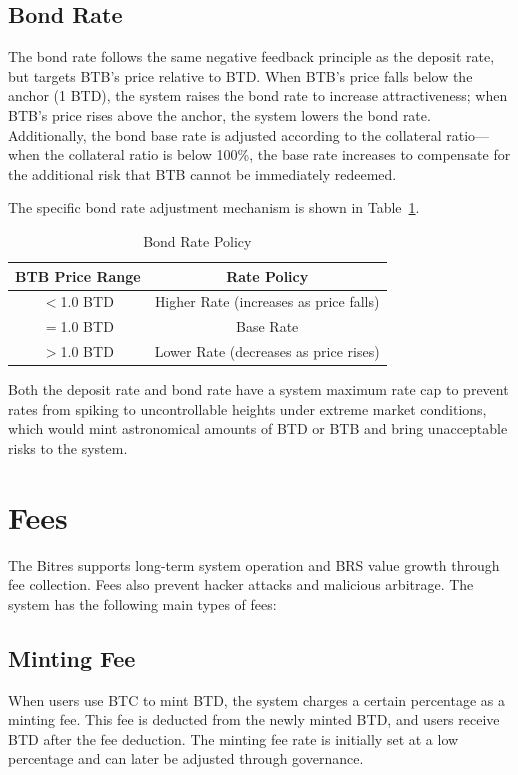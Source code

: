 \documentclass{article}
\begin{document}
\subsection{Bond Rate}

The bond rate follows the same negative feedback principle as the deposit rate, but targets BTB's price relative to BTD. When BTB's price falls below the anchor (1 BTD), the system raises the bond rate to increase attractiveness; when BTB's price rises above the anchor, the system lowers the bond rate. Additionally, the bond base rate is adjusted according to the collateral ratio---when the collateral ratio is below 100\%, the base rate increases to compensate for the additional risk that BTB cannot be immediately redeemed.

The specific bond rate adjustment mechanism is shown in Table~\ref{tab:bond-rate}.

\begin{table}[h]
\centering
\caption{Bond Rate Policy}
\label{tab:bond-rate}
\begin{tabular}{c|c}
\toprule
BTB Price Range & Rate Policy \\
\midrule
$<$1.0 BTD & Higher Rate (increases as price falls) \\
$=$1.0 BTD & Base Rate \\
$>$1.0 BTD & Lower Rate (decreases as price rises) \\
\bottomrule
\end{tabular}
\end{table}

Both the deposit rate and bond rate have a system maximum rate cap to prevent rates from spiking to uncontrollable heights under extreme market conditions, which would mint astronomical amounts of BTD or BTB and bring unacceptable risks to the system.

\section{Fees}

The Bitres supports long-term system operation and BRS value growth through fee collection. Fees also prevent hacker attacks and malicious arbitrage. The system has the following main types of fees:

\subsection{Minting Fee}

When users use BTC to mint BTD, the system charges a certain percentage as a minting fee. This fee is deducted from the newly minted BTD, and users receive BTD after the fee deduction. The minting fee rate is initially set at a low percentage and can later be adjusted through governance.
\end{document}
